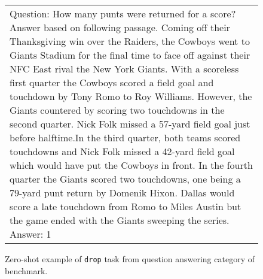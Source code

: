 \begin{figure}[h]
\centering
\begin{tabular}{p{}}
\cellcolor{oldlace} Question: How many punts were returned for a score?\vspace{1pt} \newline Answer based on following passage.\vspace{1pt} \newline \vspace{1pt} \newline Coming off their Thanksgiving win over the Raiders, the Cowboys went to Giants Stadium for the final time to face off against their NFC East rival the New York Giants. With a scoreless first quarter the Cowboys scored a field goal and touchdown by Tony Romo to Roy Williams. However, the Giants countered by scoring two touchdowns in the second quarter. Nick Folk missed a 57-yard field goal just before halftime.In the third quarter, both teams scored touchdowns and Nick Folk missed a 42-yard field goal which would have put the Cowboys in front. In the fourth quarter the Giants scored two touchdowns, one being a 79-yard punt return by Domenik Hixon. Dallas would score a late touchdown from Romo to Miles Austin but the game ended with the Giants sweeping the series.\vspace{1pt} \newline \vspace{1pt} \newline Answer: \textcolor{cadmiumgreen}{1} \\
\end{tabular}
\caption{Zero-shot example of \texttt{drop} task from question answering category of \promptsource benchmark.}
\end{figure}




